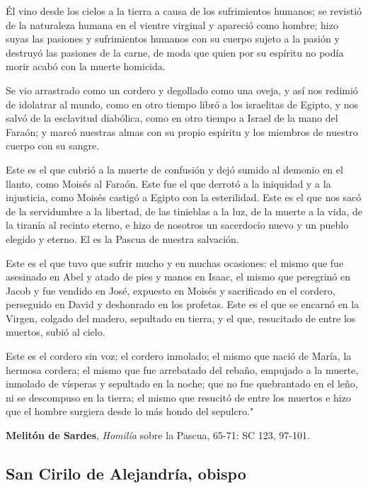\begin{patercite}
	Él vino desde los cielos a la tierra a causa de los sufrimientos humanos; se revistió de la naturaleza humana en el vientre virginal y apareció como hombre; hizo suyas las pasiones y sufrimientos humanos con su cuerpo sujeto a la pasión y destruyó las pasiones de la carne, de moda que quien por su espíritu no podía morir acabó con la muerte homicida.
	
	Se vio arrastrado como un cordero y degollado como una oveja, y así nos redimió de idolatrar al mundo, como en otro tiempo libró a los israelitas de Egipto, y nos salvó de la esclavitud diabólica, como en otro tiempo a Israel de la mano del Faraón; y marcó nuestras almas con su propio espíritu y los miembros de nuestro cuerpo con su sangre.
	
	Este es el que cubrió a la muerte de confusión y dejó sumido al demonio en el llanto, como Moisés al Faraón. Este fue el que derrotó a la iniquidad y a la injusticia, como Moisés castigó a Egipto con la esterilidad. Este es el que nos sacó de la servidumbre a la libertad, de las tinieblas a la luz, de la muerte a la vida, de la tiranía al recinto eterno, e hizo de nosotros un sacerdocio nuevo y un pueblo elegido y eterno. El es la Pascua de nuestra salvación.
	
	Este es el que tuvo que sufrir mucho y en muchas ocasiones: el mismo que fue asesinado en Abel y atado de pies y manos en Isaac, el mismo que peregrinó en Jacob y fue vendido en José, expuesto en Moisés y sacrificado en el cordero, perseguido en David y deshonrado en los profetas. Este es el que se encarnó en la Virgen, colgado del madero, sepultado en tierra, y el que, resucitado de entre los muertos, subió al cielo.
	
	Este es el cordero sin voz; el cordero inmolado; el mismo que nació de María, la hermosa cordera; el mismo que fue arrebatado del rebaño, empujado a la muerte, inmolado de vísperas y sepultado en la noche; que no fue quebrantado en el leño, ni se descompuso en la tierra; el mismo que resucitó de entre los muertos e hizo que el hombre surgiera desde lo más hondo del sepulcro."
	
	\textbf{Melitón de Sardes}, \textit{Homilía} sobre la Pascua,  65-71: SC 123, 97-101.	
\end{patercite}	

\newsection
\subsection{San Cirilo de Alejandría, obispo}

